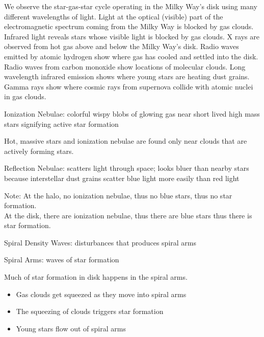 \documentclass[12pt]{article}
\begin{document}
We observe the star-gas-star cycle operating in the Milky Way's disk using many different wavelengths of light. Light at the optical (visible) part of the electromagnetic spectrum coming from the Milky Way is blocked by gas clouds. Infrared light reveals stars whose visible light is blocked by gas clouds. X rays are observed from hot gas above and below the Milky Way's disk. Radio waves emitted by atomic hydrogen show where gas has cooled and settled into the disk. Radio waves from carbon monoxide show locations of molecular clouds. Long wavelength infrared emission shows where young stars are heating dust grains. Gamma rays show where cosmic rays from supernova collide with atomic nuclei in gas clouds. 
\begin{definition} Ionization Nebulae: colorful wispy blobs of glowing gas near short lived high mass stars signifying active star formation \end{definition}
Hot, massive stars and ionization nebulae are found only near clouds that are actively forming stars. 
\begin{definition} Reflection Nebulae: scatters light through space; looks bluer than nearby stars because interstellar dust grains scatter blue light more easily than red light \end{definition}
Note: At the halo, no ionization nebulae, thus no blue stars, thus no star formation. \\ At the disk, there are ionization nebulae, thus there are blue stars thus there is star formation. 
\begin{definition} Spiral Density Waves: disturbances that produces spiral arms \end{definition}
\begin{definition} Spiral Arms: waves of star formation \end{definition}
Much of star formation in disk happens in the spiral arms. 
\begin{itemize} 
\item Gas clouds get squeezed as they move into spiral arms 
\item The squeezing of clouds triggers star formation 
\item Young stars flow out of spiral arms \end{itemize} 
\end{document}
